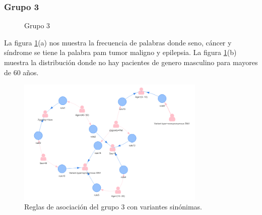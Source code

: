 \subsubsection*{Grupo 3}

\begin{figure}[h]
	\centering
	\caption{Grupo 3} \label{fig:c3}
\end{figure}

La figura \ref{fig:c3}(a) nos muestra la frecuencia de palabras donde seno, cáncer y síndrome se tiene la palabra pam tumor maligno y epilepsia. La figura \ref{fig:c3}(b) muestra la distribución donde no hay pacientes de genero masculino para mayores de 60 años.  

\begin{figure}[H]
	\centering
	\includegraphics[width=0.8\textwidth]{Kap4/reglas3_1}
	\caption{Reglas de asociación del grupo 3 con variantes sinónimas.} \label{fig:r3}
\end{figure}

